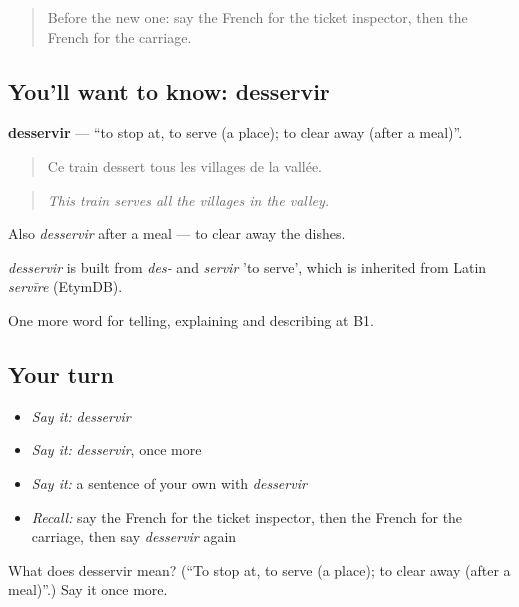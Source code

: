 \label{lesson:FR-C413-desservir}



\begin{quote}
Before the new one: say the French for the ticket inspector, then the French for the carriage.
\end{quote}

\subsection*{You'll want to know: desservir}
\textbf{desservir} — \textquotedblleft{}to stop at, to serve (a place); to clear away (after a meal)\textquotedblright{}.

\begin{quote}
Ce train dessert tous les villages de la vallée.
\end{quote}

\begin{quote}
\emph{This train serves all the villages in the valley.}
\end{quote}

Also \emph{desservir} after a meal — to clear away the dishes.

\begin{cousinweb}
\emph{desservir} is built from \emph{des-} and \emph{servir} 'to serve', which is inherited from Latin \emph{servīre} (EtymDB).
\end{cousinweb}

\begin{grammarlens}[title={What you've built}]
One more word for telling, explaining and describing at B1.
\end{grammarlens}

\subsection*{Your turn}
\begin{itemize}
\raggedright
  \item \emph{Say it:} \emph{desservir}
  \item \emph{Say it:} \emph{desservir}, once more
  \item \emph{Say it:} a sentence of your own with \emph{desservir}
  \item \emph{Recall:} say the French for the ticket inspector, then the French for the carriage, then say \emph{desservir} again
\end{itemize}

\begin{tcolorbox}[breakable,colback=teal!4,colframe=teal!35!black,title={Before you move on}]
What does desservir mean? (\textquotedblleft{}To stop at, to serve (a place); to clear away (after a meal)\textquotedblright{}.) Say it once more.
\end{tcolorbox}
